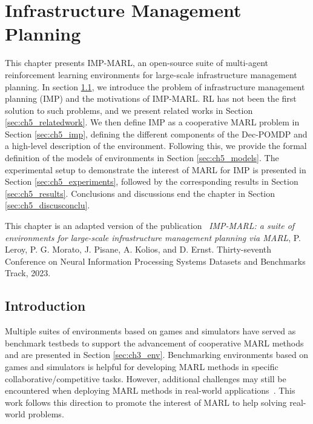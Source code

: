 \chapter{Infrastructure Management Planning}\label{ch:impmarl}

\begin{chapter_outline}

This chapter presents IMP-MARL, an open-source suite of multi-agent reinforcement learning environments for large-scale infrastructure management planning.
In section \ref{sec:ch5_intro}, we introduce the problem of infrastructure management planning (IMP) and the motivations of IMP-MARL.
RL has not been the first solution to such problems, and we present related works in Section \ref{sec:ch5_relatedwork}.
We then define IMP as a cooperative MARL problem in Section \ref{sec:ch5_imp}, defining the different components of the Dec-POMDP and a high-level description of the environment.
Following this, we provide the formal definition of the models of environments in Section \ref{sec:ch5_models}.
The experimental setup to demonstrate the interest of MARL for IMP is presented in Section \ref{sec:ch5_experiments}, followed by the corresponding results in Section \ref{sec:ch5_results}.
Conclusions and discussions end the chapter in Section \ref{sec:ch5_discusconclu}.

This chapter is an adapted version of the publication~\citep{leroy2023impmarl} \textit{IMP-MARL: a suite of environments for large-scale infrastructure management planning via MARL}, P. Leroy, P. G. Morato, J. Pisane, A. Kolios, and D. Ernst. Thirty-seventh Conference on Neural Information Processing Systems Datasets and Benchmarks Track, 2023.
\end{chapter_outline}

\section{Introduction}\label{sec:ch5_intro}
Multiple suites of environments based on games and simulators have served as benchmark testbeds to support the advancement of cooperative MARL methods and are presented in Section \ref{sec:ch3_env}.
Benchmarking environments based on games and simulators is helpful for developing MARL methods in specific collaborative/competitive tasks.
However, additional challenges may still be encountered when deploying MARL methods in real-world applications~\citep{oroojlooy2022review}.
This work follows this direction to promote the interest of MARL to help solving real-world problems.

